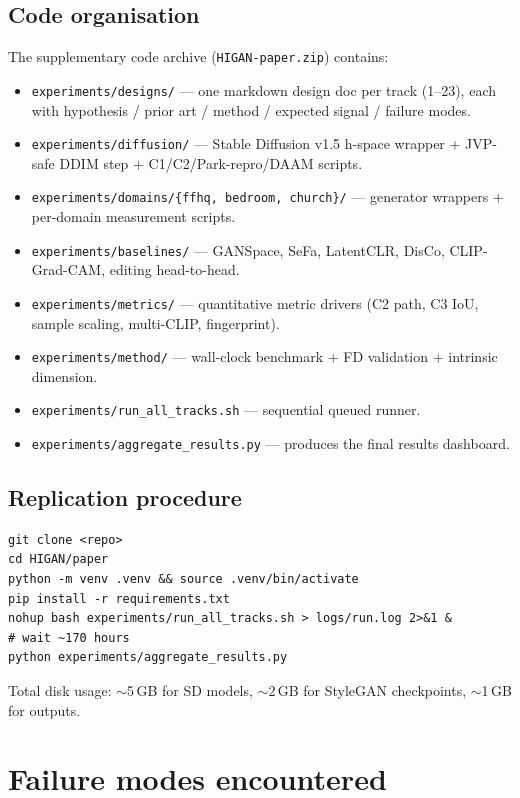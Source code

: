 \subsection{Code organisation}
The supplementary code archive (\texttt{HIGAN-paper.zip}) contains:
\begin{itemize}
\item \texttt{experiments/designs/} — one markdown design doc per
      track (1--23), each with hypothesis / prior art / method /
      expected signal / failure modes.
\item \texttt{experiments/diffusion/} — Stable Diffusion v1.5
      h-space wrapper + JVP-safe DDIM step + C1/C2/Park-repro/DAAM
      scripts.
\item \texttt{experiments/domains/\{ffhq, bedroom, church\}/} —
      generator wrappers + per-domain measurement scripts.
\item \texttt{experiments/baselines/} — GANSpace, SeFa, LatentCLR,
      DisCo, CLIP-Grad-CAM, editing head-to-head.
\item \texttt{experiments/metrics/} — quantitative metric drivers
      (C2 path, C3 IoU, sample scaling, multi-CLIP, fingerprint).
\item \texttt{experiments/method/} — wall-clock benchmark + FD
      validation + intrinsic dimension.
\item \texttt{experiments/run\_all\_tracks.sh} — sequential queued
      runner.
\item \texttt{experiments/aggregate\_results.py} — produces the
      final results dashboard.
\end{itemize}

\subsection{Replication procedure}
\begin{verbatim}
git clone <repo>
cd HIGAN/paper
python -m venv .venv && source .venv/bin/activate
pip install -r requirements.txt
nohup bash experiments/run_all_tracks.sh > logs/run.log 2>&1 &
# wait ~170 hours
python experiments/aggregate_results.py
\end{verbatim}

Total disk usage: $\sim$5\,GB for SD models, $\sim$2\,GB for
StyleGAN checkpoints, $\sim$1\,GB for outputs.

\section{Failure modes encountered}
\label{app:failures}

